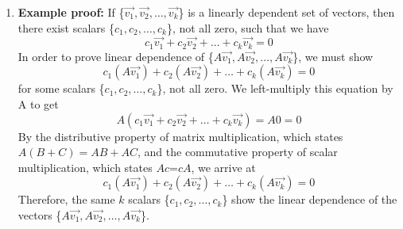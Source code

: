 \documentclass[11pt]{article}
\begin{document}
\begin{enumerate}
    \item \textbf{Example proof:}
    If \{$\vec{v_1},\vec{v_2}, \hdots, \vec{v_k}$\} is a linearly dependent set of vectors, then there exist scalars \{$c_{1},c_{2}, \hdots, c_{k}$\}, not all zero, such that we have
    \begin{equation}
        c_{1}\vec{v_1}+c_{2}\vec{v_2}+\hdots+c_{k}\vec{v_k}=0
    \end{equation}
    In order to prove linear dependence of \{$A\vec{v_1},A\vec{v_2}, \hdots, A\vec{v_k}$\}, we must show 
    \begin{equation}
        c_{1}(A\vec{v_1})+c_{2}(A\vec{v_2})+\hdots+c_{k}(A\vec{v_k})=0
    \end{equation}
    for some scalars \{$c_{1},c_{2}, \hdots, c_{k}$\}, not all zero.
    We left-multiply this equation by A to get
    \begin{equation}
        A\left(
        c_{1}\vec{v_1}+c_{2}\vec{v_2}+\hdots+c_{k}\vec{v_k}
        \right)=A0=0
    \end{equation}
    By the distributive property of matrix multiplication, which states $A(B+C)=AB+AC$, and the commutative property of scalar multiplication, which states $Ac$\hspace{1 mm}=\hspace{1 mm}$cA$, we arrive at
    \begin{equation}
        c_{1}(A\vec{v_1})+c_{2}(A\vec{v_2})+\hdots+c_{k}(A\vec{v_k})=0
    \end{equation}
    Therefore, the same $k$ scalars \{$c_{1},c_{2}, \hdots, c_{k}$\} show the linear dependence of the vectors \{$A\vec{v_1},A\vec{v_2}, \hdots, A\vec{v_k}$\}.
\end{enumerate}
\end{document}
